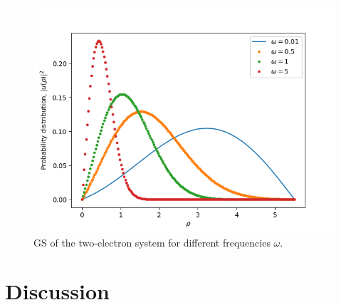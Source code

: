 \begin{figure}[H]
	\includegraphics[width=\linewidth]{groundstates4.png}
	\caption{GS of the two-electron system for different frequencies $\omega$.}
	\label{gs4}
\end{figure}

	\section{Discussion}
